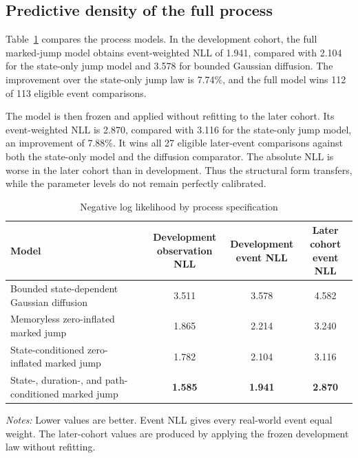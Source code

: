\documentclass[11pt]{article}
\begin{document}
\subsection{Predictive density of the full process}

Table~\ref{tab:nll} compares the process models. In the development cohort, the full marked-jump
model obtains event-weighted NLL of 1.941, compared with 2.104 for the state-only jump model and
3.578 for bounded Gaussian diffusion. The improvement over the state-only jump law is 7.74\%, and
the full model wins 112 of 113 eligible event comparisons.

The model is then frozen and applied without refitting to the later cohort. Its event-weighted NLL
is 2.870, compared with 3.116 for the state-only jump model, an improvement of 7.88\%. It wins all
27 eligible later-event comparisons against both the state-only model and the diffusion
comparator. The absolute NLL is worse in the later cohort than in development. Thus the
structural form transfers, while the parameter levels do not remain perfectly calibrated.

\begin{table}[htbp]
\centering
\caption{Negative log likelihood by process specification}
\label{tab:nll}
\begingroup
\small
\setlength{\tabcolsep}{2.5pt}
\begin{tabular}{p{}ccc}
\toprule
Model & \shortstack{Development\\observation NLL} &
\shortstack{Development\\event NLL} & \shortstack{Later cohort\\event NLL} \\
\midrule
Bounded state-dependent Gaussian diffusion & 3.511 & 3.578 & 4.582 \\
Memoryless zero-inflated marked jump & 1.865 & 2.214 & 3.240 \\
State-conditioned zero-inflated marked jump & 1.782 & 2.104 & 3.116 \\
State-, duration-, and path-conditioned marked jump & \textbf{1.585} & \textbf{1.941} & \textbf{2.870} \\
\bottomrule
\end{tabular}
\endgroup
\begin{minipage}{0.96\textwidth}
\footnotesize \emph{Notes:} Lower values are better. Event NLL gives every real-world event equal
weight. The later-cohort values are produced by applying the frozen development law without
refitting.
\end{minipage}
\end{table}
\end{document}
